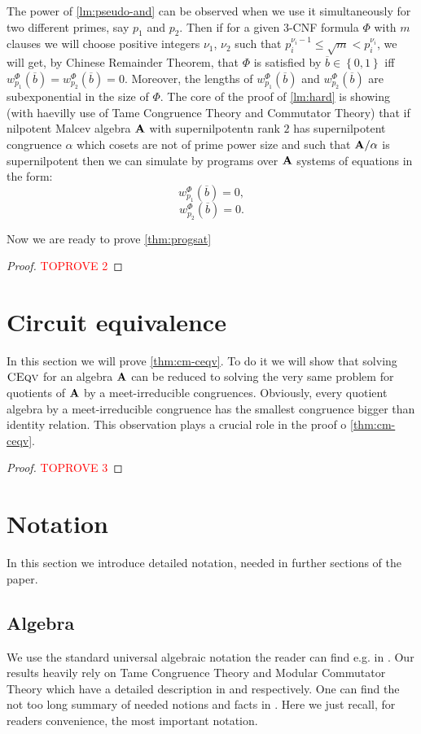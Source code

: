 \documentclass[11pt,a4paper]{amsart}
\newcommand{\m}[1]{{\uppercase {\bf{#1}}}}
\newcommand{\set}[1]{{\left\{ {#1} \right\} }}
\renewcommand{\leq}{\leqslant}
\renewcommand{\o}[1]{\overline {#1}}
\newcommand{\gProblem}[2]{\ensuremath{\operatorname{\textup{\textsc{{#2}}}}
		\ifthenelse{\equal{#1}{}}{}{\!\left( {#1} \right)}}}
\newcommand{\ceqv}[1]{\gProblem{#1}{CEqv}}
\begin{document}
The power of \cref{lm:pseudo-and} can be observed when we use it simultaneously for two different primes, say $p_1$ and $p_2$. Then if for a given 3-CNF formula $\Phi$ with $m$ clauses we will choose  positive integers $\nu_1$, $\nu_2$ such that $p_i^{\nu_i-1}\leq \sqrt{m}< p_i^{\nu_i}$, we will get, by Chinese Remainder Theorem, that $\Phi$ is satisfied by $\o b\in\set{0,1}$ iff $w^\Phi_{p_1}(\o b) =w^\Phi_{p_2}(\o b) = 0$. Moreover, the lengths of $w^\Phi_{p_1}(\o b)$ and $w^\Phi_{p_2}(\o b)$ are subexponential in the size of $\Phi$. The core of the proof of \cref{lm:hard} is showing (with haevilly use of Tame Congruence Theory and Commutator Theory) that if nilpotent Malcev algebra $\m A$ with supernilpotentn rank $2$ has supernilpotent congruence $\alpha$ which cosets are not of prime power size and such that $\m A/\alpha$ is supernilpotent then we can simulate by programs over $\m A$ systems of equations in the form:
\[
w^\Phi_{p_1}(\o b) = 0,
\]
\[
w^\Phi_{p_2}(\o b) = 0.
\]

Now we are ready to prove \cref{thm:progsat}
\begin{proof}\textcolor{red}{TOPROVE 2}\end{proof}


\section{Circuit equivalence}
In this section we will prove \cref{thm:cm-ceqv}. To do it we will show that solving \ceqv{} for an algebra $\m A$ can be reduced to solving the very same problem for quotients of $\m A$ by a meet-irreducible congruences. Obviously, every quotient algebra by a meet-irreducible congruence has the smallest congruence bigger than identity relation. This observation plays a crucial role in the proof o \cref{thm:cm-ceqv}.

\begin{proof}\textcolor{red}{TOPROVE 3}\end{proof}


\section{Notation}

In this section we introduce detailed notation, needed in further sections of the paper.
\subsection*{Algebra} 
We use the standard universal algebraic notation the reader can find e.g. in \cite{BurrisSankappanavar}. Our results heavily rely on Tame Congruence Theory and Modular Commutator Theory which have a detailed description in \cite{hm} and \cite{fm} respectively. One can find the not too long summary of needed notions and facts  in \cite[Section 2]{IdziakK22}. Here we just recall, for readers convenience, the most important notation.
\end{document}
